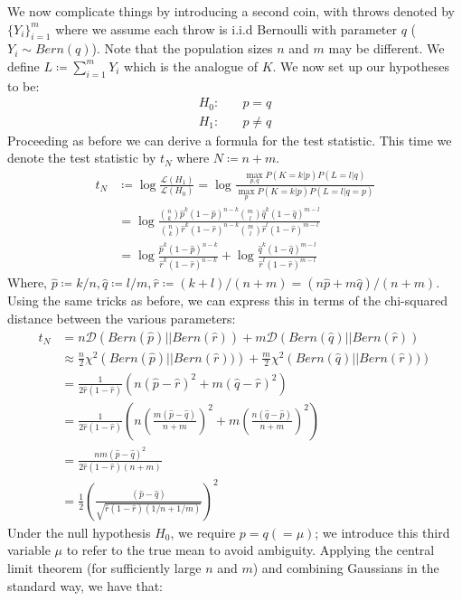\documentclass[]{article}
\newcommand{\lik}{\mathcal{L}}
\newcommand{\kl}{\mathcal{D}}
\begin{document}
We now complicate things by introducing a second coin, with throws denoted by $\{Y_i\}_{i=1}^{m}$ where we assume each throw is i.i.d Bernoulli with parameter $q$ ($Y_i \sim Bern(q)$). Note that the population sizes $n$ and $m$ may be different. We define $L \coloneqq \sum_{i=1}^{m} Y_i$ which is the analogue of $K$. We now set up our hypotheses to be:
%
\begin{align*}
H_0:& \quad p = q \\
H_1:& \quad p \neq q
\end{align*}
%
Proceeding as before we can derive a formula for the test statistic. This time we denote the test statistic by $t_N$ where $N \coloneqq n + m$.
%
\begin{align*}
t_N &\coloneqq \log \frac{\lik(H_1)}{\lik(H_0)}
= \log \frac{\max_{p,q} P(K=k|p) P(L=l|q)}{\max_p P(K=k|p) P(L=l|q=p)} \\
&= \log \frac
{\binom{n}{k} \hat{p}^k (1 - \hat{p})^{n-k} \binom{m}{l} \hat{q}^k (1 - \hat{q})^{m-l}}
{\binom{n}{k} \hat{r}^k (1 - \hat{r})^{n-k} \binom{m}{l} \hat{r}^l (1 - \hat{r})^{m-l}} \\
&= \log \frac
{ \hat{p}^k (1 - \hat{p})^{n-k}}
{ \hat{r}^k (1 - \hat{r})^{n-k}}
+ \log \frac{\hat{q}^k (1 - \hat{q})^{m-l}}{ \hat{r}^l (1 - \hat{r})^{m-l}}
\end{align*} 
%
Where, $\hat{p} \coloneqq k/n, \hat{q} \coloneqq l/m, \hat{r} \coloneqq (k+l)/(n+m) = (n\hat{p} + m\hat{q})/(n+m)$. Using the same tricks as before, we can express this in terms of the chi-squared distance between the various parameters:
%
\begin{align*}
t_N &= n \kl\left(Bern(\hat{p}) || Bern(\hat{r})\right)
+ m \kl\left(Bern(\hat{q}) || Bern(\hat{r})\right) \\ 
&\approx \frac{n}{2} \chi^2\left(Bern(\hat{p})||Bern(\hat{r}))\right)
+ \frac{m}{2} \chi^2\left(Bern(\hat{q})||Bern(\hat{r}))\right) \\
&= \frac{1}{2\hat{r}(1-\hat{r})} \left(
n(\hat{p} - \hat{r})^2 + m(\hat{q} - \hat{r})^2
\right) \\
&= \frac{1}{2\hat{r}(1-\hat{r})} \left(
n\left( \frac{m(\hat{p} - \hat{q})}{n+m}\right)^2 + 
m\left( \frac{n(\hat{q} - \hat{p})}{n+m}\right)^2
\right) \\
&= \frac{nm(\hat{p} - \hat{q})^2}{2\hat{r}(1-\hat{r})(n+m)} \\
&= \frac{1}{2} \left( \frac{\left(\hat{p} - \hat{q}\right)}{\sqrt{\hat{r}(1-\hat{r})(1/n+1/m)}}  \right)^2
\end{align*}
%
Under the null hypothesis $H_0$, we require $p=q(=\mu)$; we introduce this third variable $\mu$ to refer to the true mean to avoid ambiguity. Applying the central limit theorem (for sufficiently large $n$ and $m$) and combining Gaussians in the standard way, we have that:
\end{document}
